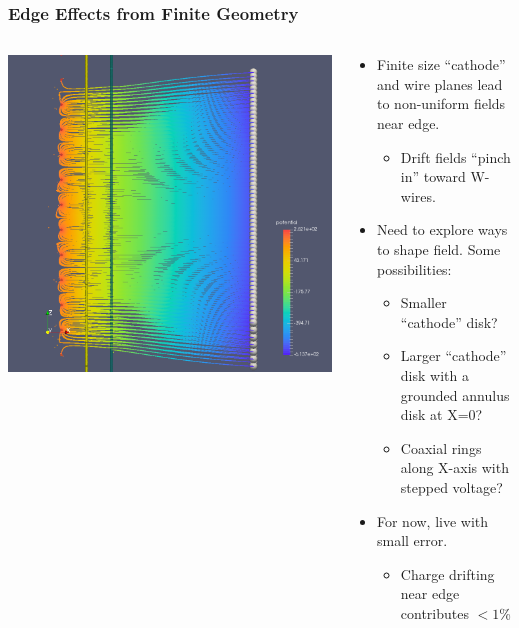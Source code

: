 \documentclass[xcolor=dvipsnames]{beamer}
\begin{document}
\begin{frame}
  \frametitle{Edge Effects from Finite Geometry}
  \begin{columns}
    \begin{column}{0.4\textwidth}
      \begin{center}
        \includegraphics[width=\textwidth,clip,trim=4cm 0cm 10cm 0cm]{steps/upaths2.png}    
      \end{center}
    \end{column}
    \begin{column}{0.6\textwidth}
      \begin{itemize}
      \item Finite size ``cathode'' and wire planes lead to
        non-uniform fields near edge.
        \begin{itemize}\footnotesize
        \item Drift fields ``pinch in'' toward W-wires.
        \end{itemize}
      \item Need to explore ways to shape field.  Some possibilities:
        \begin{itemize}\footnotesize
        \item Smaller ``cathode'' disk?
        \item Larger ``cathode'' disk with a grounded annulus disk at X=0?
        \item Coaxial rings along X-axis with stepped voltage?
        \end{itemize}
      \item For now, live with small error.  
        \begin{itemize}\footnotesize
        \item Charge drifting near edge contributes $< 1$\%
        \end{itemize}
      \end{itemize}
    \end{column}
  \end{columns}
  
\end{frame}
\end{document}
